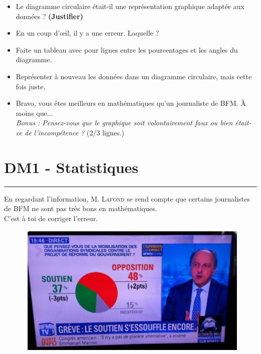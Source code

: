 \documentclass[12pt]{article}
\newcommand{\horrule}[1]{\rule{\linewidth}{#1}} %
\begin{document}
\begin{itemize}
	\item[1.] Le diagramme circulaire était-il une représentation graphique adaptée aux données ? \textbf{(Justifier)}
	\item[2.] En un coup d'œil, il y a une erreur. Laquelle ?
	\item[3.] Faite un tableau avec pour lignes entre les pourcentages et les angles du diagramme.
	\item[4.] Représenter à nouveau les données dans un diagramme circulaire, mais cette fois juste.
	\item[b1.] Bravo, vous êtes meilleurs en mathématiques qu'un journaliste de BFM. À moins que... \\
	\textit{Bonus : Pensez-vous que le graphique soit volontairement faux ou bien était-ce de l'incompétence ?} (2/3 lignes.)
\end{itemize}	

\vspace{1cm}
\section*{DM1 - Statistiques}
\horrule{2px}

\begin{multicols}{2}
En regardant l'information, \textsc{M. Lafond} se rend compte que certains journalistes de \textsc{BFM} ne sont pas très bons en mathématiques.\\
C'est à toi de corriger l'erreur. 

\begin{figure}[H]
	\centering
	\includegraphics[width=\linewidth]{3x1-statistiques/sources/bfm.jpg}
\end{figure}

\end{multicols}
\end{document}
